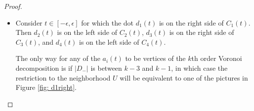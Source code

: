 \documentclass[11pt,oneside]{amsart}
\theoremstyle{definition}
\theoremstyle{remark}
\numberwithin{equation}{section}
\begin{document}
\begin{proof}
\begin{itemize}
\begin{figure}[h!t]
\[\begin{tikzpicture}[scale=.5]
\begin{scope}[xshift=8cm]
        \draw[thick] (1) to (2);
        \draw[thick] (2) to (3);
        \draw[thick] (3) to (4);
        \draw[thick] (4) to (1);
        \draw[thick] (1) to (-5,0);
        \draw[thick] (2) to (0,5);
        \draw[thick] (3) to (5,0);
        \draw[thick] (4) to (0,-5);
    \end{scope}
    \begin{scope}[xshift=16cm]
        \node at (0,-4) {$|D_-|=k-1$};
        \draw[dashed] (0,0) circle (3.25);
        \clip (0,0) circle (3.25);
        \node[dot,thick,fill=black] (2) at (90:1) {};
        \node[ right] at (2) {$a_2(t)$};
        \node[dot,thick,fill=black] (4) at (270:1) {};
        \node[ left] at (4) {$a_4(t)$};

        \draw[thick] (2) to (4);
        \draw[thick] (2) to (-5,5);
        \draw[thick] (4) to (-5,-5);
        \draw[thick] (2) to (5,5);
        \draw[thick] (4) to (5,-5);
    \end{scope}
\end{tikzpicture}
\]
\caption{Local structure of $k$th order Voronoi decomp, when $d_1(t)$ is left of $C_1(t)$}
\label{fig: d1left}
\end{figure}
    \item Consider $t\in [-\epsilon,\epsilon]$ for which the dot $d_1(t)$ is on the right side of $C_1(t)$. Then $d_2(t)$ is on the left side of $C_2(t)$, $d_3(t)$ is on the right side of $C_3(t)$, and $d_4(t)$ is on the left side of $C_4(t)$.
    
    The only way for any of the $a_i(t)$ to be vertices of the $k$th order Voronoi decomposition is if $|D_-|$ is between $k-3$ and $k-1$, in which case the restriction to the neighborhood $U$ will be equivalent to one of the pictures in Figure \ref{fig: d1right}.
    


\end{itemize}
\end{proof}
\end{document}
